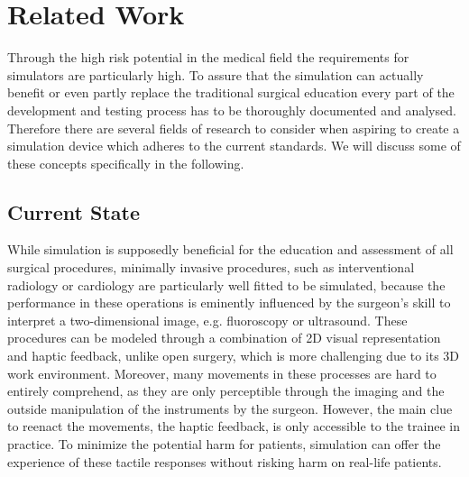 \chapter{Related Work}\label{relatedwork}

Through the high risk potential in the medical field the requirements for simulators are particularly high. To assure that the simulation can actually benefit or even partly replace the traditional surgical education every part of the development and testing process has to be thoroughly documented and analysed. Therefore there are several fields of research to consider when aspiring to create a simulation device which adheres to the current standards. We will discuss some of these concepts specifically in the following. 

\section{Current State}


While simulation is supposedly beneficial for the education and assessment of all surgical procedures, minimally invasive procedures, such as interventional radiology or cardiology are particularly well fitted to be simulated, because the performance in these operations is eminently influenced by the surgeon’s skill to interpret a two-dimensional image, e.g. fluoroscopy or ultrasound.\parencite{johnson_virtual_2012}\parencite{green_current_2014} These procedures can be modeled through a combination of 2D visual representation and haptic feedback, unlike open surgery, which is more challenging due to its 3D work environment\parencite{pandey_expanding_2012}. Moreover, many movements in these processes are hard to entirely comprehend, as they are only perceptible through the imaging and the outside manipulation of the instruments by the surgeon. However, the main clue to reenact the movements, the haptic feedback, is only accessible to the trainee in practice. To minimize the potential harm for patients, simulation can offer the experience of these tactile responses without risking harm on real-life patients\parencite{johnson_development_2011}.
